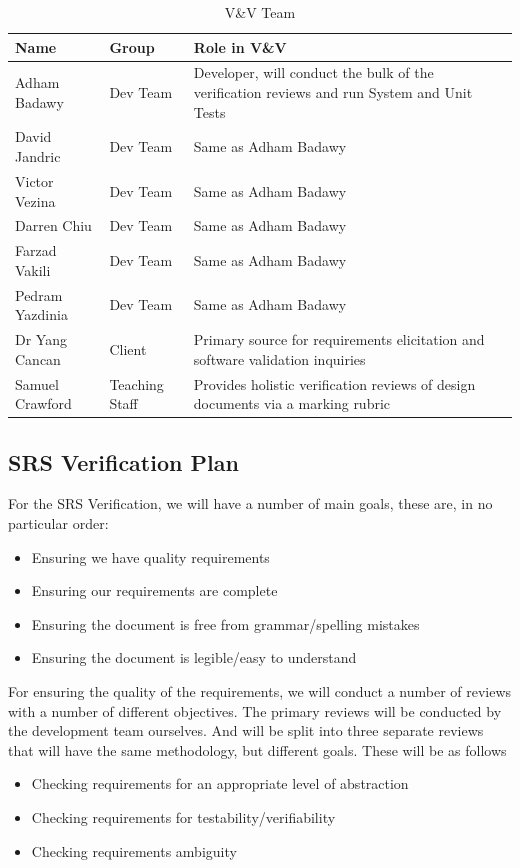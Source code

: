 \documentclass[12pt, titlepage]{article}
\begin{document}
\begin{table}[hp]
  \caption{V\&V Team} \label{TblVnVTeam}
  \begin{tabularx}{\textwidth}{llX}
  \toprule
  \textbf{Name} & \textbf{Group} & \textbf{Role in V\&V}\\
  \midrule
  Adham Badawy& Dev Team & Developer, will conduct the bulk of the verification reviews and run System and Unit Tests\\
  David Jandric& Dev Team & Same as Adham Badawy\\
  Victor Vezina& Dev Team & Same as Adham Badawy\\
  Darren Chiu& Dev Team & Same as Adham Badawy\\
  Farzad Vakili& Dev Team & Same as Adham Badawy\\
  Pedram Yazdinia& Dev Team & Same as Adham Badawy\\
  Dr Yang Cancan& Client & Primary source for requirements elicitation and software validation inquiries\\
  Samuel Crawford& Teaching Staff & Provides holistic verification reviews of design documents via a marking rubric\\
  
  \bottomrule
  \end{tabularx}
  \end{table}

\subsection{SRS Verification Plan}

For the SRS Verification, we will have a number of main goals, these are, in no particular order:
\begin{itemize}
\item Ensuring we have quality requirements
\item Ensuring our requirements are complete
\item Ensuring the document is free from grammar/spelling mistakes
\item Ensuring the document is legible/easy to understand
\end{itemize}
For ensuring the quality of the requirements, we will conduct a number of reviews with a number of different objectives. The primary reviews will be conducted by
the development team ourselves. And will be split into three separate reviews that will have the same methodology, but different goals. These will be as follows
\begin{itemize}
\item Checking requirements for an appropriate level of abstraction
\item Checking requirements for testability/verifiability 
\item Checking requirements ambiguity
\end{itemize} 
\end{document}
